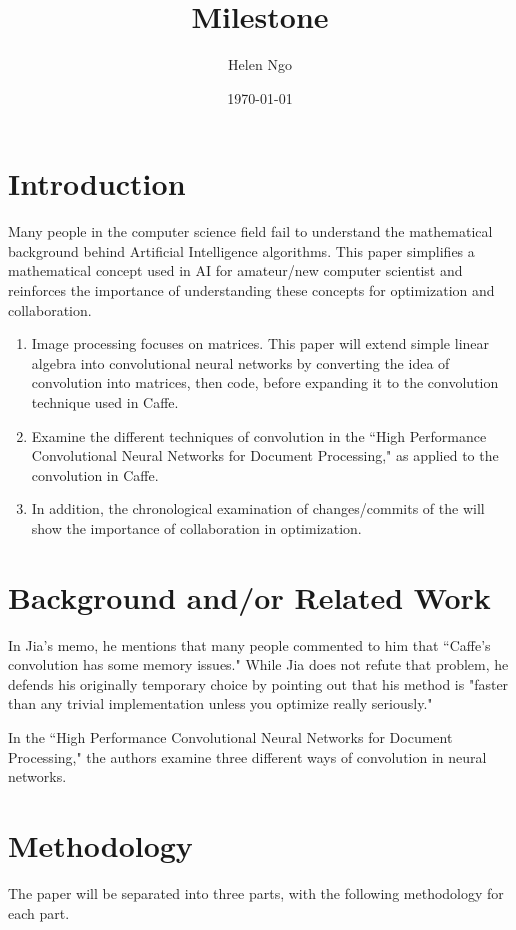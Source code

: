 \documentclass[a4paper]{article}
\title{Milestone}
\author{Helen Ngo}
\date{\today}
\begin{document}
\lstset{language=Python,basicstyle=\ttfamily\footnotesize}

\maketitle

\begin{doublespace}

\section{Introduction}
Many people in the computer science field fail to understand the mathematical background behind Artificial Intelligence algorithms. This paper simplifies a mathematical concept used in AI for amateur/new computer scientist and reinforces the importance of understanding these concepts for optimization and collaboration.
\begin{enumerate}
\item Image processing focuses on matrices. This paper will extend simple linear algebra into convolutional neural networks by converting the idea of convolution into matrices, then code, before expanding it to the convolution technique used in Caffe.
\item Examine the different techniques of convolution in the ``High Performance Convolutional Neural Networks for Document Processing," as applied to the convolution in Caffe.
\item In addition, the chronological examination of changes/commits of the will show the importance of collaboration in optimization.
\end{enumerate}

\section{Background and/or Related Work}
In Jia's memo, he mentions that many people commented to him that ``Caffe's convolution has some memory issues." While Jia does not refute that problem, he defends his originally temporary choice by pointing out that his method is "faster than any trivial implementation unless you optimize really seriously."

In the ``High Performance Convolutional Neural Networks for Document Processing," the authors examine three different ways of convolution in neural networks.

\newpage 
\section{Methodology}
The paper will be separated into three parts, with the following methodology for each part.


\end{doublespace}
\end{document}
